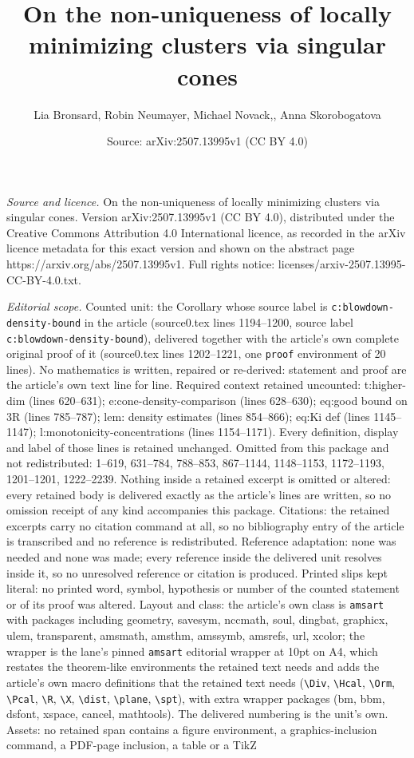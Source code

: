 \documentclass[10pt,a4paper]{amsart}
\title[On the non-uniqueness of locally minimizing clusters via sin]{On the non-uniqueness of locally minimizing clusters via singular cones}
\author{Lia Bronsard, Robin Neumayer, Michael Novack,, Anna Skorobogatova}
\date{Source: arXiv:2507.13995v1 (CC BY 4.0)}
\begin{document}
\maketitle

\noindent\emph{Source and licence.} On the non-uniqueness of locally minimizing clusters via singular cones. Version arXiv:2507.13995v1 (CC BY 4.0), distributed under the Creative Commons Attribution 4.0 International licence, as recorded in the arXiv licence metadata for this exact version and shown on the abstract page https://arxiv.org/abs/2507.13995v1. Full rights notice: licenses/arxiv-2507.13995-CC-BY-4.0.txt.\par\smallskip

\noindent\textit{Editorial scope.} Counted unit: the Corollary whose source label is \texttt{c:blowdown-density-bound} in the article (source0.tex lines 1194--1200, source label \texttt{c:blowdown-density-bound}), delivered together with the article's own complete original proof of it (source0.tex lines 1202--1221, one \texttt{proof} environment of 20 lines). No mathematics is written, repaired or re-derived: statement and proof are the article's own text line for line. Required context retained uncounted: t:higher-dim (lines 620--631); e:cone-density-comparison (lines 628--630); eq:good bound on 3R (lines 785--787); lem: density estimates (lines 854--866); eq:Ki def (lines 1145--1147); l:monotonicity-concentrations (lines 1154--1171). Every definition, display and label of those lines is retained unchanged. Omitted from this package and not redistributed: 1--619, 631--784, 788--853, 867--1144, 1148--1153, 1172--1193, 1201--1201, 1222--2239. Nothing inside a retained excerpt is omitted or altered: every retained body is delivered exactly as the article's lines are written, so no omission receipt of any kind accompanies this package. Citations: the retained excerpts carry no citation command at all, so no bibliography entry of the article is transcribed and no reference is redistributed. Reference adaptation: none was needed and none was made; every reference inside the delivered unit resolves inside it, so no unresolved reference or citation is produced. Printed slips kept literal: no printed word, symbol, hypothesis or number of the counted statement or of its proof was altered. Layout and class: the article's own class is \texttt{amsart} with packages including geometry, savesym, nccmath, soul, dingbat, graphicx, ulem, transparent, amsmath, amsthm, amssymb, amsrefs, url, xcolor; the wrapper is the lane's pinned \texttt{amsart} editorial wrapper at 10pt on A4, which restates the theorem-like environments the retained text needs and adds the article's own macro definitions that the retained text needs (\texttt{\textbackslash Div}, \texttt{\textbackslash Hcal}, \texttt{\textbackslash Orm}, \texttt{\textbackslash Pcal}, \texttt{\textbackslash R}, \texttt{\textbackslash X}, \texttt{\textbackslash dist}, \texttt{\textbackslash plane}, \texttt{\textbackslash spt}), with extra wrapper packages (bm, bbm, dsfont, xspace, cancel, mathtools). The delivered numbering is the unit's own. Assets: no retained span contains a figure environment, a graphics-inclusion command, a PDF-page inclusion, a table or a TikZ 
\end{document}
